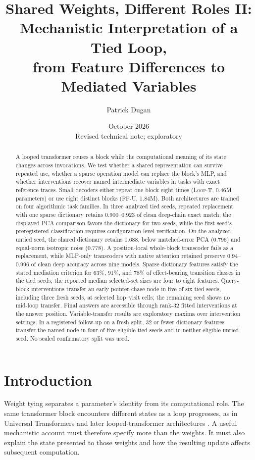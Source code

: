 \documentclass[10pt,letterpaper]{article}
\title{\bfseries Shared Weights, Different Roles II:\\[0.35em]
Mechanistic Interpretation of a Tied Loop,\\[0.15em]
from Feature Differences to Mediated Variables}
\author{Patrick Dugan}
\date{October 2026\\[0.2em]\normalsize Revised technical note; exploratory}
\newcommand{\LoopT}{\textsc{Loop-T}}
\newcommand{\FFU}{\textsc{FF-U}}
\begin{document}
\maketitle
\vspace{-0.7em}
\begin{abstract}
\noindent
A looped transformer reuses a block while the computational meaning of its state changes across invocations. We test whether a shared representation can survive repeated use, whether a sparse operation model can replace the block's MLP, and whether interventions recover named intermediate variables in tasks with exact reference traces. Small decoders either repeat one block eight times (\LoopT, 0.46M parameters) or use eight distinct blocks (\FFU, 1.84M). Both architectures are trained on four algorithmic task families. In three analyzed tied seeds, repeated replacement with one sparse dictionary retains 0.900--0.923 of clean deep-chain exact match; the displayed PCA comparison favors the dictionary for two seeds, while the first seed's preregistered classification requires configuration-level verification. On the analyzed untied seed, the shared dictionary retains 0.688, below matched-error PCA (0.796) and equal-norm isotropic noise (0.778). A position-local whole-block transcoder fails as a replacement, while MLP-only transcoders with native attention retained preserve 0.94--0.996 of clean deep accuracy across nine models. Sparse dictionary features satisfy the stated mediation criterion for 63\%, 91\%, and 78\% of effect-bearing transition classes in the tied seeds; the reported median selected-set sizes are four to eight features. Query-block interventions transfer an early pointer-chase node in five of six tied seeds, including three fresh seeds, at selected hop--visit cells; the remaining seed shows no mid-loop transfer. Final answers are accessible through rank-32 fitted interventions at the answer position. Variable-transfer results are exploratory maxima over intervention settings. In a registered follow-up on a fresh split, 32 or fewer dictionary features transfer the named node in four of five eligible tied seeds and in neither eligible untied seed. No sealed confirmatory split was used.
\end{abstract}

\section{Introduction}
Weight tying separates a parameter's identity from its computational role. The same transformer block encounters different states as a loop progresses, as in Universal Transformers and later looped-transformer architectures \cite{dehghani,giannou,li,saunshi}. A useful mechanistic account must therefore specify more than the weights. It must also explain the state presented to those weights and how the resulting update affects subsequent computation.
\end{document}
